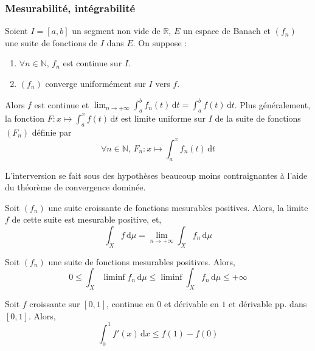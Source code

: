   \subsubsection{Mesurabilité, intégrabilité}


  \begin{theorem}
    Soient $I = [a,b]$ un segment non vide de $\mathbb{R}$, $E$ un espace de Banach et $(f_n)$ une suite de fonctions de $I$ dans $E$. On suppose :
    \begin{enumerate}[label={\bfseries(\roman*)}]
      \item $\forall n \in \mathbb{N}, \, f_n$ est continue sur $I$.
      \item $(f_n)$ converge uniformément sur $I$ vers $f$.
    \end{enumerate}
    Alors $f$ est continue et $\lim_{n \rightarrow +\infty} \int_a^b f_n(t) \, \mathrm{d}t = \int_a^b f(t) \, \mathrm{d}t$. Plus généralement, la fonction $F : x \mapsto \int_a^x f(t) \, \mathrm{d}t$ est limite uniforme sur $I$ de la suite de fonctions $(F_n)$ définie par
    \[ \forall n \in \mathbb{N}, \, F_n : x \mapsto \int_a^x f_n(t) \, \mathrm{d}t \]
  \end{theorem}

  \begin{remark}
    L'interversion se fait sous des hypothèses beaucoup moins contraignantes à l'aide du théorème de convergence dominée.
  \end{remark}


  \begin{theorem}
    Soit $(f_n)$ une suite croissante de fonctions mesurables positives. Alors, la limite $f$ de cette suite est mesurable positive, et,
    \[ \int_X f \, \mathrm{d}\mu = \lim_{n \rightarrow +\infty} \int_X f_n \, \mathrm{d}\mu \]
  \end{theorem}


  \begin{theorem}
    Soit $(f_n)$ une suite de fonctions mesurables positives. Alors,
    \[ 0 \leq \int_X \liminf f_n \, \mathrm{d}\mu \leq \liminf \int_X f_n \, \mathrm{d}\mu \leq +\infty \]
  \end{theorem}

  \begin{example}
    \label{241-1}
    Soit $f$ croissante sur $[0,1]$, continue en $0$ et dérivable en $1$ et dérivable pp. dans $[0,1]$. Alors,
    \[ \int_{0}^{1} f'(x) \, \mathrm{d}x \leq f(1) - f(0) \]
  \end{example}

